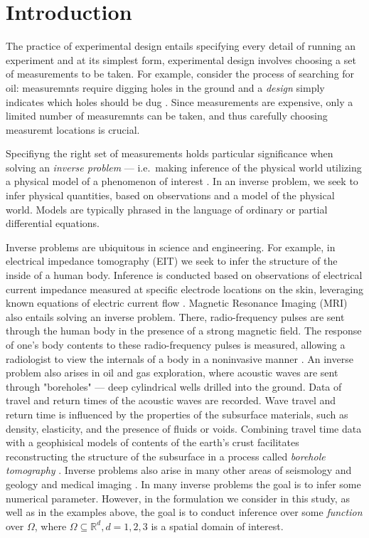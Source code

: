 \documentclass[ba]{imsart}
\theoremstyle{plain}
\theoremstyle{definition}
\theoremstyle{remark}
\begin{document}
\section{Introduction}\label{section:intro}
The practice of experimental design entails specifying every detail of
running an experiment \cite{chaloner1995} and at its simplest form,
experimental design involves choosing a set of measurements to be
taken. For example, consider the process of searching for oil:
measuremnts require digging holes in the ground and a \emph{design}
simply indicates which holes should be dug
\cite{horesh2008borehole}. Since measurements are expensive, only a
limited number of measuremnts can be taken, and thus carefully
choosing measuremt locations is crucial.

Specifiyng the right set of measurements holds particular significance
when solving an \emph{inverse problem} --- i.e.~making inference of
the physical world utilizing a physical model of a phenomenon of
interest \cite{tarantola2005,kaipio2005}. In an inverse problem, we
seek to infer physical quantities, based on observations and a model
of the physical world. Models are typically phrased in the language of
ordinary or partial differential equations.

Inverse problems are ubiquitous in science and engineering. For
example, in electrical impedance tomography (EIT) we seek to infer the
structure of the inside of a human body. Inference is conducted based
on observations of electrical current impedance measured at specific
electrode locations on the skin, leveraging known equations of
electric current flow \cite{horesh2010impedance}. Magnetic Resonance
Imaging (MRI) also entails solving an inverse problem. There,
radio-frequency pulses are sent through the human body in the presence
of a strong magnetic field. The response of one's body contents to
these radio-frequency pulses is measured, allowing a radiologist to
view the internals of a body in a noninvasive manner
\cite{horesh2008mri}. An inverse problem also arises in oil and gas
exploration, where acoustic waves are sent through "boreholes" ---
deep cylindrical wells drilled into the ground. Data of travel and
return times of the acoustic waves are recorded. Wave travel and
return time is influenced by the properties of the subsurface
materials, such as density, elasticity, and the presence of fluids or
voids. Combining travel time data with a geophisical models of
contents of the earth's crust facilitates reconstructing the structure
of the subsurface in a process called \emph{borehole tomography}
\cite{horesh2008borehole}. Inverse problems also arise in many other
areas of seismology and geology \cite{rabinowitz1990, steinberg1995}
and medical imaging \cite{tarantola2005}. In many inverse problems the
goal is to infer some numerical parameter. However, in the formulation
we consider in this study, as well as in the examples above, the goal
is to conduct inference over some \emph{function} over $\Omega$, where
\(\Omega \subseteq \mathbb{R}^d, d=1,2,3\) is a spatial domain of
interest.
\end{document}
